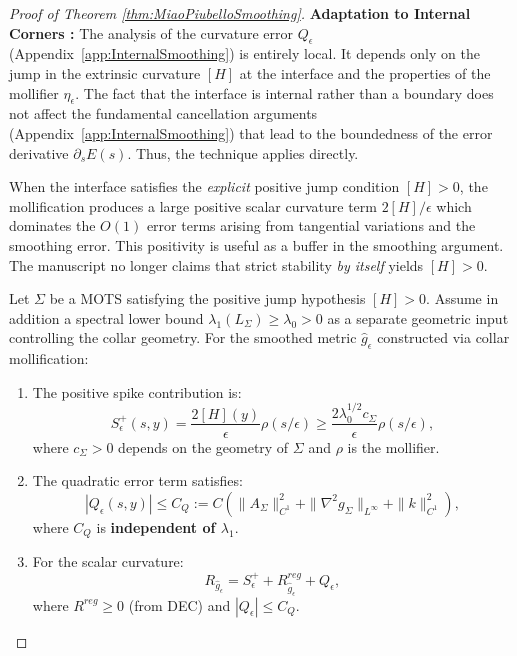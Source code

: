\begin{proof}[Proof of Theorem \ref{thm:MiaoPiubelloSmoothing}]
\textbf{Adaptation to Internal Corners :}
The analysis of the curvature error $Q_\epsilon$ (Appendix~\ref{app:InternalSmoothing}) is entirely local. It depends only on the jump in the extrinsic curvature $[H]$ at the interface and the properties of the mollifier $\eta_\epsilon$. The fact that the interface is internal rather than a boundary does not affect the fundamental cancellation arguments (Appendix~\ref{app:InternalSmoothing}) that lead to the boundedness of the error derivative $\partial_s E(s)$. Thus, the technique applies directly.

\begin{remark}
When the interface satisfies the \emph{explicit} positive jump condition $[H] > 0$, the mollification produces a large positive scalar curvature term $2[H]/\epsilon$ which dominates the $O(1)$ error terms arising from tangential variations and the smoothing error. This positivity is useful as a buffer in the smoothing argument. The manuscript no longer claims that strict stability \emph{by itself} yields $[H] > 0$.
\end{remark}

\begin{lemma}\label{lem:SpikeDomination}
Let $\Sigma$ be a MOTS satisfying the positive jump hypothesis $[H] > 0$. Assume in addition a spectral lower bound $\lambda_1(L_\Sigma) \ge \lambda_0 > 0$ as a separate geometric input controlling the collar geometry. For the smoothed metric $\hat{g}_\epsilon$ constructed via collar mollification:
\begin{enumerate}
    \item[(i)] The positive spike contribution is:
    \[
        S^+_\epsilon(s, y) = \frac{2[H](y)}{\epsilon} \rho(s/\epsilon) \ge \frac{2\lambda_0^{1/2} c_\Sigma}{\epsilon} \rho(s/\epsilon),
    \]
    where $c_\Sigma > 0$ depends on the geometry of $\Sigma$ and $\rho$ is the mollifier.
    
    \item[(ii)] The quadratic error term satisfies:
    \[
        |Q_\epsilon(s, y)| \le C_Q := C\left( \|A_\Sigma\|_{C^1}^2 + \|\nabla^2 g_\Sigma\|_{L^\infty} + \|k\|_{C^1}^2 \right),
    \]
    where $C_Q$ is \textbf{independent of $\lambda_1$}.
    
    \item[(iii)] For the scalar curvature:
    \[
        R_{\hat{g}_\epsilon} = S^+_\epsilon + R^{reg}_{\hat{g}_\epsilon} + Q_\epsilon,
    \]
    where $R^{reg} \ge 0$ (from DEC) and $|Q_\epsilon| \le C_Q$.
    

\end{enumerate}
\end{lemma}
\end{proof}
